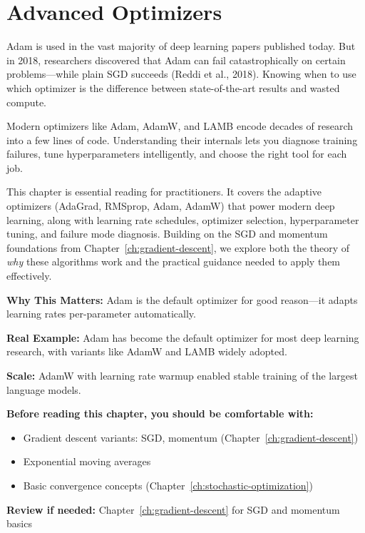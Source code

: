 \documentclass[../../main.tex]{subfiles}
\begin{document}
\chapter{Advanced Optimizers}
\label{ch:advanced-optimizers}

Adam is used in the vast majority of deep learning papers published today. But in 2018, researchers discovered that Adam can fail catastrophically on certain problems---while plain SGD succeeds (Reddi et al., 2018). Knowing when to use which optimizer is the difference between state-of-the-art results and wasted compute.

\begin{whycare}
Modern optimizers like Adam, AdamW, and LAMB encode decades of research into a few lines of code. Understanding their internals lets you diagnose training failures, tune hyperparameters intelligently, and choose the right tool for each job.
\end{whycare}

\begin{keyconcept}
This chapter is essential reading for practitioners. It covers the adaptive optimizers (AdaGrad, RMSprop, Adam, AdamW) that power modern deep learning, along with learning rate schedules, optimizer selection, hyperparameter tuning, and failure mode diagnosis. Building on the SGD and momentum foundations from Chapter~\ref{ch:gradient-descent}, we explore both the theory of \textit{why} these algorithms work and the practical guidance needed to apply them effectively.
\end{keyconcept}

\begin{realworld}
\textbf{Why This Matters:} Adam is the default optimizer for good reason---it adapts learning rates per-parameter automatically.

\textbf{Real Example:} Adam has become the default optimizer for most deep learning research, with variants like AdamW and LAMB widely adopted.

\textbf{Scale:} AdamW with learning rate warmup enabled stable training of the largest language models.
\end{realworld}

\begin{prerequisites}
\textbf{Before reading this chapter, you should be comfortable with:}
\begin{itemize}
    \item Gradient descent variants: SGD, momentum (Chapter~\ref{ch:gradient-descent})
    \item Exponential moving averages
    \item Basic convergence concepts (Chapter~\ref{ch:stochastic-optimization})
\end{itemize}
\textbf{Review if needed:} Chapter~\ref{ch:gradient-descent} for SGD and momentum basics
\end{prerequisites}
\end{document}
